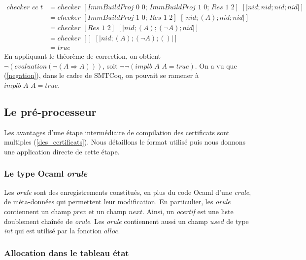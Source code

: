 \documentclass[11pt]{article}
\begin{document}
\begin{align*}
    checker \,\, cc \,\, t &= checker \,\, [ImmBuildProj \,\, 0 \,\, 0; \,ImmBuildProj \,\, 1 \,\, 0; \, Res \,\, 1 \,\, 2] \,\, [| nid; nid; nid; nid|] \\
    &= checker \,\, [ImmBuildProj \,\, 1 \,\, 0; \, Res \,\, 1 \,\, 2] \,\, [| nid; (A); nid; nid|] \\
    &= checker \,\, [Res \,\, 1 \,\, 2] \,\, [| nid; (A); (\neg A); nid|] \\
    &= checker \,\, [] \,\, [| nid; (A); (\neg A); ()|] \\
    &= true
\end{align*}
En appliquant le théorème de correction, on obtient $\neg (evaluation (\neg (A \Rightarrow A)))$, soit $\neg \neg (implb\,\, A \,\,A = true)$. On a vu que (\ref{negation}), dans le cadre de SMTCoq, on pouvait se ramener à $implb \,\, A \,\, A = true$.

\subsection{Le pré-processeur}

Les avantages d'une étape intermédiaire de compilation des certificats sont multiples (\ref{des_certificats}). Nous détaillons le format utilisé puis nous donnons une application directe de cette étape.

\subsubsection{Le type Ocaml \textit{orule}}

 Les \textit{orule} sont des enregistrements constitués, en plus du code Ocaml d'une \textit{crule}, de méta-données qui permettent leur modification. En particulier, les \textit{orule} contiennent un champ $prev$ et un champ $next$. Ainsi, un \textit{ocertif} est une liste doublement chaînée de \textit{orule}. Les \textit{orule} contiennent aussi un champ $used$ de type \textit{int} qui est utilisé par la fonction $alloc$.


\subsubsection{Allocation dans le tableau état} \label{alloc}
\end{document}
